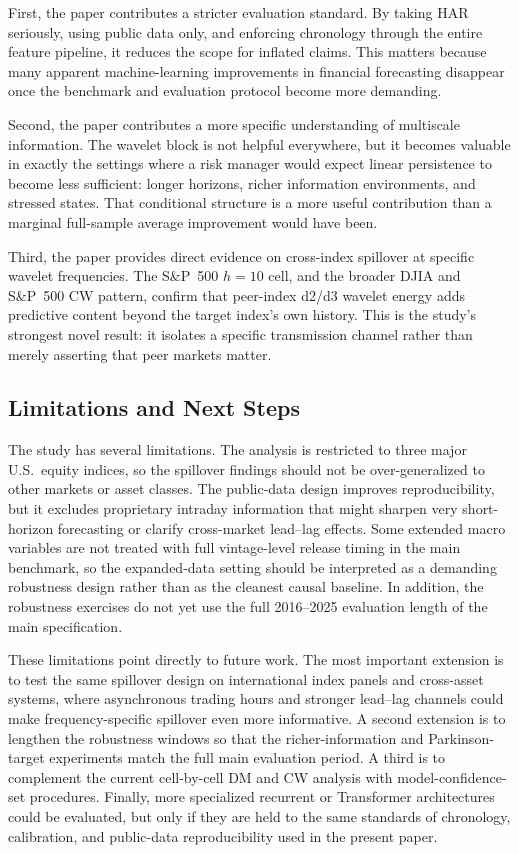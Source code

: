 First, the paper contributes a stricter evaluation standard. By taking HAR seriously, using public data only, and enforcing chronology through the entire feature pipeline, it reduces the scope for inflated claims. This matters because many apparent machine-learning improvements in financial forecasting disappear once the benchmark and evaluation protocol become more demanding.

Second, the paper contributes a more specific understanding of multiscale information. The wavelet block is not helpful everywhere, but it becomes valuable in exactly the settings where a risk manager would expect linear persistence to become less sufficient: longer horizons, richer information environments, and stressed states. That conditional structure is a more useful contribution than a marginal full-sample average improvement would have been.

Third, the paper provides direct evidence on cross-index spillover at specific wavelet frequencies. The S\&P~500 \(h{=}10\) cell, and the broader DJIA and S\&P~500 CW pattern, confirm that peer-index d2/d3 wavelet energy adds predictive content beyond the target index's own history. This is the study's strongest novel result: it isolates a specific transmission channel rather than merely asserting that peer markets matter.

\subsection{Limitations and Next Steps}
\label{subsec:limitations}

The study has several limitations. The analysis is restricted to three major U.S.\ equity indices, so the spillover findings should not be over-generalized to other markets or asset classes. The public-data design improves reproducibility, but it excludes proprietary intraday information that might sharpen very short-horizon forecasting or clarify cross-market lead--lag effects. Some extended macro variables are not treated with full vintage-level release timing in the main benchmark, so the expanded-data setting should be interpreted as a demanding robustness design rather than as the cleanest causal baseline. In addition, the robustness exercises do not yet use the full 2016--2025 evaluation length of the main specification.

These limitations point directly to future work. The most important extension is to test the same spillover design on international index panels and cross-asset systems, where asynchronous trading hours and stronger lead--lag channels could make frequency-specific spillover even more informative. A second extension is to lengthen the robustness windows so that the richer-information and Parkinson-target experiments match the full main evaluation period. A third is to complement the current cell-by-cell DM and CW analysis with model-confidence-set procedures. Finally, more specialized recurrent or Transformer architectures could be evaluated, but only if they are held to the same standards of chronology, calibration, and public-data reproducibility used in the present paper.

